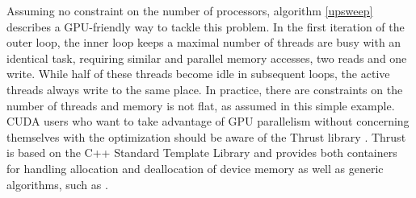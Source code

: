Assuming no constraint on the number of processors, algorithm \ref{upsweep} describes a GPU-friendly way to tackle this problem. In the first iteration of the outer loop, the inner loop keeps a maximal number of threads are busy with an identical task, requiring similar and parallel memory accesses, two reads and one write. While half of these threads become idle in subsequent loops, the active threads always write to the same place. In practice, there are constraints on the number of threads and memory is not flat, as assumed in this simple example. CUDA users who want to take advantage of GPU parallelism without concerning themselves with the optimization should be aware of the Thrust library \cite{thrust}. Thrust is based on the C++ Standard Template Library and provides both containers for handling allocation and deallocation of device memory as well as generic algorithms, such as .



